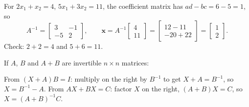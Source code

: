 \documentclass[10pt]{scrartcl}
\newcommand{\vv}[1]{\mathbf{#1}}
\begin{document}
\begin{example*}
For $2x_1+x_2=4$, $5x_1+3x_2=11$, the coefficient matrix has $ad-bc=6-5=1$, so
\[
  A^{-1}=\begin{bmatrix}3&-1\\-5&2\end{bmatrix},\qquad
  \vv x=A^{-1}\begin{bmatrix}4\\11\end{bmatrix}=\begin{bmatrix}12-11\\-20+22\end{bmatrix}=\begin{bmatrix}1\\2\end{bmatrix}.
\]
Check: $2+2=4$ and $5+6=11$.
\end{example*}

\begin{example*}
If $A$, $B$ and $A+B$ are invertible $n\times n$ matrices:
\begin{itemize}
  \ii From $(X+A)B=I$: multiply on the right by $B^{-1}$ to get $X+A=B^{-1}$, so $X=B^{-1}-A$.
  \ii From $AX+BX=C$: factor $X$ on the right, $(A+B)X=C$, so $X=(A+B)^{-1}C$.
\end{itemize}
\end{example*}
\end{document}
